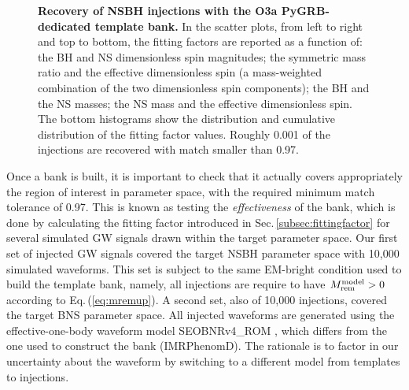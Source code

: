 \documentclass[binding=0.6cm, LaM]{sapthesis}
\begin{document}
        \begin{figure}[!t]
          \noindent
          \centering
          \caption{{\bf Recovery of NSBH injections with the O3a {\ttfamily PyGRB}-dedicated template bank.}  In the scatter plots, from left to right and top to bottom, the fitting factors are reported as a function of: the BH and NS dimensionless spin magnitudes; the symmetric mass ratio and the effective dimensionless spin (a mass-weighted combination of the two dimensionless spin components); the BH and the NS masses; the NS mass and the effective dimensionless spin.  The bottom histograms show the distribution and cumulative distribution of the fitting factor values.  Roughly 0.001 of the injections are recovered with match smaller than 0.97.}
          \label{fig:fittingfactor}
        \end{figure}

	Once a bank is built, it is important to check that it actually covers appropriately the region of interest in parameter space, with the required minimum match tolerance of 0.97.
        This is known as testing the \emph{effectiveness} of the bank,
        which is done by calculating the fitting factor introduced in Sec.\,\ref{subsec:fittingfactor} for several simulated GW signals drawn within the target parameter space.
        Our first set of injected GW signals covered the target NSBH parameter space with 10,000 simulated waveforms.
        This set is subject to the same EM-bright condition used to build the template bank, namely, all injections are require to have $M_{\rm rem}^{\rm model}>0$ according to Eq.\,(\ref{eq:mremup}).
        A second set, also of 10,000 injections, covered the target BNS parameter space.
        All injected waveforms are generated using the effective-one-body waveform model {\ttfamily SEOBNRv4\_ROM} \cite{172}, which differs from the one used to construct the bank ({\ttfamily IMRPhenomD}).  The rationale is to factor in our uncertainty about the waveform by switching to a different model from templates to injections.
\end{document}
